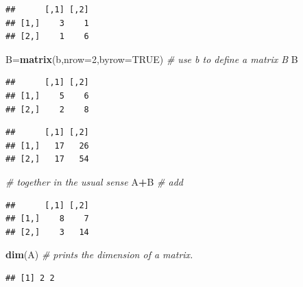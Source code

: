 \documentclass[]{book}
\newenvironment{Shaded}{\begin{snugshade}}{\end{snugshade}}
\newcommand{\CommentTok}[1]{\textcolor[rgb]{0.56,0.35,0.01}{\textit{#1}}}
\newcommand{\DataTypeTok}[1]{\textcolor[rgb]{0.13,0.29,0.53}{#1}}
\newcommand{\DecValTok}[1]{\textcolor[rgb]{0.00,0.00,0.81}{#1}}
\newcommand{\KeywordTok}[1]{\textcolor[rgb]{0.13,0.29,0.53}{\textbf{#1}}}
\newcommand{\NormalTok}[1]{#1}
\newcommand{\OperatorTok}[1]{\textcolor[rgb]{0.81,0.36,0.00}{\textbf{#1}}}
\newcommand{\OtherTok}[1]{\textcolor[rgb]{0.56,0.35,0.01}{#1}}
\theoremstyle{definition}
\theoremstyle{definition}
\theoremstyle{definition}
\theoremstyle{remark}
\begin{document}
\begin{verbatim}
##      [,1] [,2]
## [1,]    3    1
## [2,]    1    6
\end{verbatim}

\begin{Shaded}
\begin{Highlighting}[]
\NormalTok{B=}\KeywordTok{matrix}\NormalTok{(b,}\DataTypeTok{nrow=}\DecValTok{2}\NormalTok{,}\DataTypeTok{byrow=}\OtherTok{TRUE}\NormalTok{)    }\CommentTok{# use b to define a matrix B}
\NormalTok{B}
\end{Highlighting}
\end{Shaded}

\begin{verbatim}
##      [,1] [,2]
## [1,]    5    6
## [2,]    2    8
\end{verbatim}

\begin{Shaded}
\end{Shaded}

\begin{verbatim}
##      [,1] [,2]
## [1,]   17   26
## [2,]   17   54
\end{verbatim}

\begin{Shaded}
\begin{Highlighting}[]
                                 \CommentTok{# together in the usual sense}
\NormalTok{A}\OperatorTok{+}\NormalTok{B                              }\CommentTok{# add}
\end{Highlighting}
\end{Shaded}

\begin{verbatim}
##      [,1] [,2]
## [1,]    8    7
## [2,]    3   14
\end{verbatim}

\begin{Shaded}
\begin{Highlighting}[]
\KeywordTok{dim}\NormalTok{(A)                           }\CommentTok{# prints the dimension of a matrix.}
\end{Highlighting}
\end{Shaded}

\begin{verbatim}
## [1] 2 2
\end{verbatim}
\end{document}
